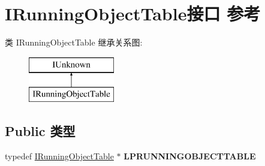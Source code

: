 \hypertarget{interface_i_running_object_table}{}\section{I\+Running\+Object\+Table接口 参考}
\label{interface_i_running_object_table}
类 I\+Running\+Object\+Table 继承关系图\+:\begin{figure}[H]
\begin{center}
\leavevmode
\includegraphics[height=2.000000cm]{interface_i_running_object_table}
\end{center}
\end{figure}
\subsection*{Public 类型}
\begin{DoxyCompactItemize}
\item 
\mbox{\label{interface_i_running_object_table_afd1ede0b964ae14a6bfa10fb9f92cd66}} 
typedef \hyperlink{interface_i_running_object_table}{I\+Running\+Object\+Table} $\ast$ {\bfseries L\+P\+R\+U\+N\+N\+I\+N\+G\+O\+B\+J\+E\+C\+T\+T\+A\+B\+LE}
\end{DoxyCompactItemize}
